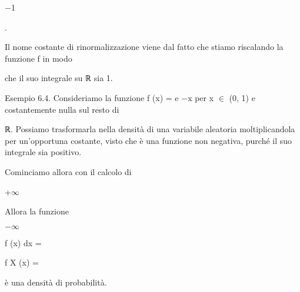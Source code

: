 \documentclass[a4paper,portrait,12pt]{article}
\begin{document}
$-$1





.





\begin{flushleft}
Il nome costante di rinormalizzazione viene dal fatto che stiamo riscalando la funzione f in modo
\end{flushleft}


\begin{flushleft}
che il suo integrale su ℝ sia 1.
\end{flushleft}


\begin{flushleft}
Esempio 6.4. Consideriamo la funzione f (x) = e $-$x per x $\in$ (0, 1) e costantemente nulla sul resto di
\end{flushleft}


\begin{flushleft}
ℝ. Possiamo trasformarla nella densit\`{a} di una variabile aleatoria moltiplicandola per un'opportuna costante, visto che \`{e} una funzione non negativa, purch\'{e} il suo integrale sia positivo.
\end{flushleft}


\begin{flushleft}
Cominciamo allora con il calcolo di
\end{flushleft}


+$\infty$





\begin{flushleft}
Allora la funzione
\end{flushleft}





$-$$\infty$





\begin{flushleft}
f (x) dx =
\end{flushleft}





\begin{flushleft}
f X (x) =
\end{flushleft}


\begin{flushleft}
\`{e} una densit\`{a} di probabilit\`{a}.
\end{flushleft}
\end{document}
